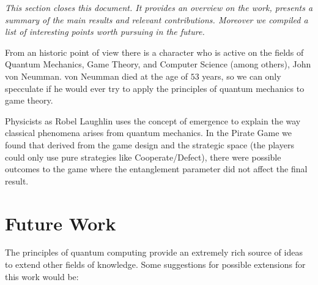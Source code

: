 \label{cap:conclusions}

\textit{This section closes this document. It provides an overview on the work, presents a summary of the main results and relevant contributions. Moreover we compiled a list of interesting points worth pursuing in the future.}

From an historic point of view there is a character who is active on the fields of Quantum Mechanics, Game Theory, and Computer Science (among others), John von Neumman. von Neumman died at the age of $53$ years, so we can only specculate if he would ever try to apply the principles of quantum mechanics to game theory. 

Physicists as Robel Laughlin uses the concept of emergence to explain the way classical phenomena arises from quantum mechanics\cite{Laughlin2005}. In the Pirate Game we found that derived from the game design and the strategic space (the players could only use pure strategies like Cooperate/Defect), there were possible outcomes to the game where the entanglement parameter did not affect the final result.

\section{Future Work}
\label{sec:5FutureWork}

The principles of quantum computing provide an extremely rich source of ideas to extend other fields of knowledge.
Some suggestions for possible extensions for this work would be:

